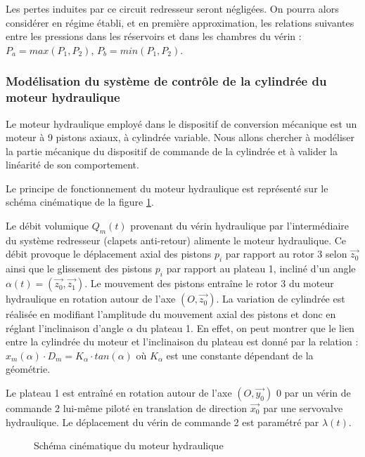 Les pertes induites par ce circuit redresseur seront négligées. On pourra alors considérer en régime établi, et en première approximation, les relations suivantes entre les pressions dans les réservoirs et dans les chambres du vérin : $P_a=max(P_1,P_2)$, $P_b=min(P_1,P_2)$.


\subsubsection{Modélisation du système de contrôle de la cylindrée du moteur hydraulique}

Le moteur hydraulique employé dans le dispositif de conversion mécanique est un moteur à 9 pistons axiaux, à cylindrée variable. Nous allons chercher à modéliser la partie mécanique du dispositif de commande de la cylindrée et à valider la linéarité de son comportement.

Le principe de fonctionnement du moteur hydraulique est représenté sur le schéma cinématique de la figure \ref{fig10}.

Le débit volumique $Q_m(t)$ provenant du vérin hydraulique par l'intermédiaire du système redresseur (clapets anti-retour) alimente le moteur hydraulique. Ce débit provoque le déplacement axial des pistons $p_i$ par rapport au rotor 3 selon $\vec{z_0}$ ainsi que le glissement des pistons $p_i$ par rapport
au plateau 1, incliné d'un angle $\alpha (t)=(\vec{z_0},\vec{z_1})$. Le mouvement des pistons entraîne le rotor 3 du moteur hydraulique en rotation autour de l'axe $(O, \vec{z_0})$. La variation de cylindrée est réalisée en
modifiant l'amplitude du mouvement axial des pistons et donc en réglant l'inclinaison d'angle $\alpha$ du plateau 1. En effet, on peut montrer que le lien entre la cylindrée du moteur et l'inclinaison du plateau est donné par la relation : $x_m(\alpha)\cdot D_m=K_\alpha\cdot tan(\alpha)$ où $K_\alpha$ est une constante dépendant de la géométrie.

Le plateau 1 est entraîné en rotation autour de l'axe $(O,\vec{y_0})$
0 par un vérin de commande 2 lui-même piloté en translation de direction $\vec{x_0}$ par une servovalve hydraulique. Le déplacement du vérin de
commande 2 est paramétré par $\lambda (t)$.

\begin{figure}[ht!]
\begin{center}
  \def\svgwidth{0.65\linewidth}
  
 \end{center}
  \caption{Schéma cinématique du moteur hydraulique}
\label{fig10}
\end{figure}


